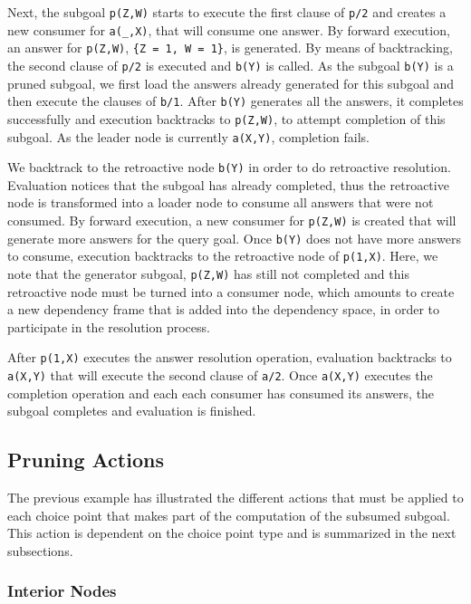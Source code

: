Next, the subgoal \texttt{p(Z,W)} starts to execute the first clause of \texttt{p/2} and creates
a new consumer for \texttt{a(\_,X)}, that will consume one answer. By forward execution, an answer
for \texttt{p(Z,W)}, \texttt{\{Z~=~1,~W~=~1\}}, is generated. By means of backtracking, the second
clause of \texttt{p/2} is executed and \texttt{b(Y)} is called. As the subgoal \texttt{b(Y)} is a pruned subgoal,
we first load the answers already generated for this subgoal and then execute the clauses of \texttt{b/1}.
After \texttt{b(Y)} generates all the answers, it completes successfully and execution backtracks to
\texttt{p(Z,W)}, to attempt completion of this subgoal. As the leader node is currently \texttt{a(X,Y)},
completion fails.

We backtrack to the retroactive node \texttt{b(Y)} in order to do retroactive resolution. Evaluation
notices that the subgoal has already completed, thus the retroactive node is transformed into a loader node
to consume all answers that were not consumed. By forward execution, a new consumer for \texttt{p(Z,W)} is
created that will generate more answers for the query goal. Once \texttt{b(Y)} does not have more answers
to consume, execution backtracks to the retroactive node of \texttt{p(1,X)}. Here, we note that
the generator subgoal, \texttt{p(Z,W)} has still not completed and this retroactive node must be turned
into a consumer node, which amounts to create a new dependency frame that is added into the dependency space,
in order to participate in the resolution process.

After \texttt{p(1,X)} executes the answer resolution
operation, evaluation backtracks to \texttt{a(X,Y)} that will execute the second clause of \texttt{a/2}.
Once \texttt{a(X,Y)} executes the completion operation and each each consumer has consumed its answers,
the subgoal completes and evaluation is finished.

\subsection{Pruning Actions}

The previous example has illustrated the different actions that must be applied to each choice point that
makes part of the computation of the subsumed subgoal. This action is dependent on the choice point
type and is summarized in the next subsections.

\subsubsection{Interior Nodes}

